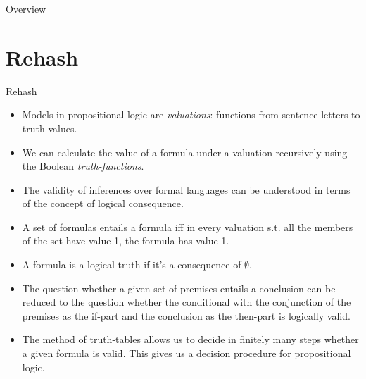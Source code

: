 \setcounter{framenumber}{163}
\begin{frame}
	\maketitle
\end{frame}

\begin{frame}{Overview}
\tableofcontents
\end{frame}

\section{Rehash}
\begin{frame}{Rehash}
	
 \begin{itemize}

	\item Models in propositional logic are \emph{valuations}: functions from sentence letters to truth-values.
	
	\item We can calculate the value of a formula under a valuation recursively using the Boolean \emph{truth-functions}.
	
	\item The validity of inferences over formal languages can be understood in terms of the concept of logical consequence.
	
	\item \alert{A set of formulas entails a formula iff in every valuation s.t. all the members of the set have value 1, the formula has value 1.}
	
	\item \alert{A formula is a logical truth if it's a consequence of $\emptyset$.}
	
	\item The question whether a given set of premises entails a conclusion can be reduced to the question whether the conditional with the conjunction of the premises as the if-part and the conclusion as the then-part is logically valid.
		
	\item The method of truth-tables allows us to decide in finitely many steps whether a given formula is valid. This gives us a decision procedure for propositional logic.
	
	
\end{itemize}

\end{frame}
		

